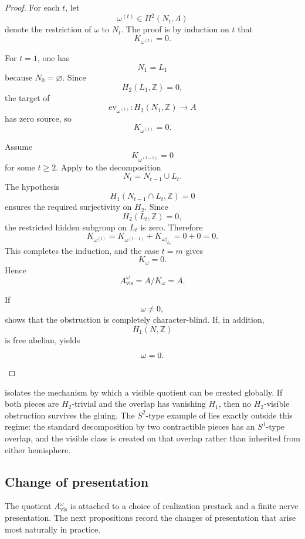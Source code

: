 \begin{proof}
For each $t$, let
\[
\omega^{(t)}\in H^2(N_t,A)
\]
denote the restriction of $\omega$ to $N_t$. The proof is by induction on $t$ that
\[
K_{\omega^{(t)}}=0.
\]

For $t=1$, one has
\[
N_1=L_1
\]
because $N_0=\varnothing$. Since
\[
H_2(L_1,\mathbb Z)=0,
\]
the target of
\[
\mathrm{ev}_{\omega^{(1)}}:H_2(N_1,\mathbb Z)\to A
\]
has zero source, so
\[
K_{\omega^{(1)}}=0.
\]

Assume
\[
K_{\omega^{(t-1)}}=0
\]
for some $t\ge 2$. Apply  to the decomposition
\[
N_t=N_{t-1}\cup L_t.
\]
The hypothesis
\[
H_1(N_{t-1}\cap L_t,\mathbb Z)=0
\]
ensures the required surjectivity on $H_2$. Since
\[
H_2(L_t,\mathbb Z)=0,
\]
the restricted hidden subgroup on $L_t$ is zero. Therefore
\[
K_{\omega^{(t)}}=K_{\omega^{(t-1)}}+K_{\omega|_{L_t}}=0+0=0.
\]
This completes the induction, and the case $t=m$ gives
\[
K_{\omega}=0.
\]
Hence
\[
A_{\mathrm{vis}}^{\omega}=A/K_{\omega}=A.
\]

If
\[
\omega\neq 0,
\]
 shows that the obstruction is completely character-blind. If, in addition,
\[
H_1(N,\mathbb Z)
\]
is free abelian,  yields
\[
\omega=0.
\qedhere
\]
\end{proof}

\begin{remark}\label{rem:overlap-created-visibility}
 isolates the mechanism by which a visible quotient can be created globally. If both pieces are $H_2$-trivial and the overlap has vanishing $H_1$, then no $H_2$-visible obstruction survives the gluing. The $S^2$-type example of  lies exactly outside this regime: the standard decomposition by two contractible pieces has an $S^1$-type overlap, and the visible class is created on that overlap rather than inherited from either hemisphere.
\end{remark}

\subsection{Change of presentation}\label{sec:visible-quotient-invariance}

The quotient $A_{\mathrm{vis}}^{\omega}$ is attached to a choice of realization prestack and a finite nerve presentation. The next propositions record the changes of presentation that arise most naturally in practice.


